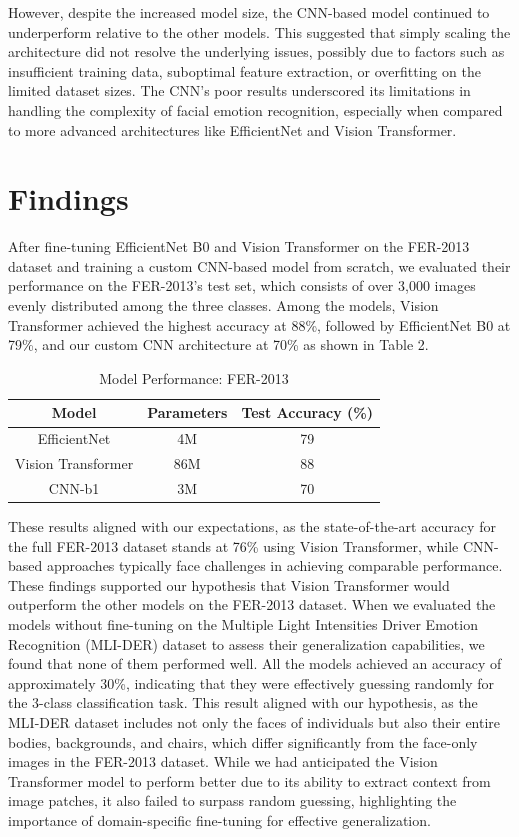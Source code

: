 \documentclass[sigconf]{acmart}
\begin{document}
However, despite the increased model size, the CNN-based model continued to underperform relative to the other models. This suggested that simply scaling the architecture did not resolve the underlying issues, possibly due to factors such as insufficient training data, suboptimal feature extraction, or overfitting on the limited dataset sizes. The CNN's poor results underscored its limitations in handling the complexity of facial emotion recognition, especially when compared to more advanced architectures like EfficientNet and Vision Transformer.

\section{Findings}



After fine-tuning EfficientNet B0 and Vision Transformer on the FER-2013 dataset and training a custom CNN-based model from scratch, we evaluated their performance on the FER-2013's test set, which consists of over 3,000 images evenly distributed among the three classes. Among the models, Vision Transformer achieved the highest accuracy at 88\%, followed by EfficientNet B0 at 79\%, and our custom CNN architecture at 70\% as shown in Table 2.

\begin{table}[h]
  \caption{Model Performance: FER-2013}
  \label{tab:fer2013-performance}
  \centering
  \begin{tabular}{|c|c|c|}
    \hline
    \textbf{Model} & \textbf{Parameters} & \textbf{Test Accuracy (\%)} \\
    \hline
    EfficientNet & 4M & 79 \\
    \hline
    Vision Transformer & 86M & 88 \\
    \hline
    CNN-b1 & 3M & 70 \\
    \hline
  \end{tabular}
\end{table}

These results aligned with our expectations, as the state-of-the-art accuracy for the full FER-2013 dataset stands at 76\% using Vision Transformer, while CNN-based approaches typically face challenges in achieving comparable performance. These findings supported our hypothesis that Vision Transformer would outperform the other models on the FER-2013 dataset.
When we evaluated the models without fine-tuning on the Multiple Light Intensities Driver Emotion Recognition (MLI-DER) dataset \cite{10226464} to assess their generalization capabilities, we found that none of them performed well. All the models achieved an accuracy of approximately 30\%, indicating that they were effectively guessing randomly for the 3-class classification task. This result aligned with our hypothesis, as the MLI-DER dataset includes not only the faces of individuals but also their entire bodies, backgrounds, and chairs, which differ significantly from the face-only images in the FER-2013 dataset. While we had anticipated the Vision Transformer model to perform better due to its ability to extract context from image patches, it also failed to surpass random guessing, highlighting the importance of domain-specific fine-tuning for effective generalization.
\end{document}
